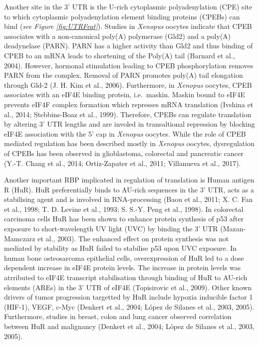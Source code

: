 \documentclass[12pt,openany]{book}
\begin{document}
Another site in the 3' UTR is the U-rich cytoplasmic polyadenylation
(CPE) site to which cytoplasmic polyadenylation element binding proteins
(CPEBs) can bind (\emph{see Figure \ref{fig:UTRFeat}}). Studies in
\emph{Xenopus} oocytes indicate that CPEB associates with a
non-canonical poly(A) polymerase (Gld2) and a poly(A) deadynelase
(PARN). PARN has a higher activity than Gld2 and thus binding of CPEB to
an mRNA leads to shortening of the Poly(A) tail (Barnard et al., 2004).
However, hormonal stimulation leading to CPEB phosphorylation removes
PARN from the complex. Removal of PARN promotes poly(A) tail elongation
through Gld-2 (J. H. Kim et al., 2006). Furthermore, in \emph{Xenopus}
oocytes, CPEB associates with an eIF4E binding protein, i.e.~maskin.
Maskin bound to eIF4E prevents eIF4F complex formation which represses
mRNA translation (Ivshina et al., 2014; Stebbins-Boaz et al., 1999).
Therefore, CPEBs can regulate translation by altering 3' UTR lengths and
are involed in transaltional repression by blocking eIF4E association
with the 5' cap in \emph{Xenopus} oocytes. While the role of CPEB
mediated regulation has been described mostly in \emph{Xenopus} oocytes,
dysregulation of CPEBs has been observed in glioblastoma, colorectal and
pancreatic cancer (Y.-T. Chang et al., 2014; Ortiz-Zapater et al., 2011;
Villanueva et al., 2017).

Another important RBP implicated in regulation of translation is Human
antigen R (HuR). HuR preferentially binds to AU-rich sequences in the 3'
UTR, acts as a stabilising agent and is involved in RNA-processing (Baou
et al., 2011; X. C. Fan et al., 1998; T. D. Levine et al., 1993; S.
S.-Y. Peng et al., 1998). In colorectal carcinoma cells HuR has been
shown to enhance protein synthesis of p53 after exposure to
short-wavelength UV light (UVC) by binding the 3' UTR (Mazan-Mamczarz et
al., 2003). The enhanced effect on protein synthesis was not mediated by
stability as HuR failed to stabilise p53 upon UVC exposure. In human
bone osteosarcoma epithelial cells, overexpression of HuR led to a dose
dependent increase in eIF4E protein levels. The increase in protein
levels was atrributed to eIF4E transcript stabilisation through binding
of HuR to AU-rich elements (AREs) in the 3' UTR of eIF4E (Topisirovic et
al., 2009). Other known drivers of tumor progression targetted by HuR
include hypoxia inducible factor 1 (HIF-1), VEGF, c-Myc (Denkert et al.,
2004; López de Silanes et al., 2003, 2005). Furthermore, studies in
breast, colon and lung cancer observed correlation between HuR and
malignancy (Denkert et al., 2004; López de Silanes et al., 2003, 2005).
\end{document}
